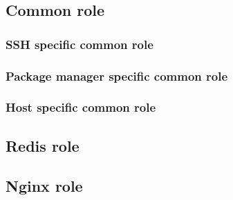 




\subsection{Common role}



\subsubsection{SSH specific common role}


\subsubsection{Package manager specific common role}



\subsubsection{Host specific common role}








\subsection{Redis role}







\subsection{Nginx role}

